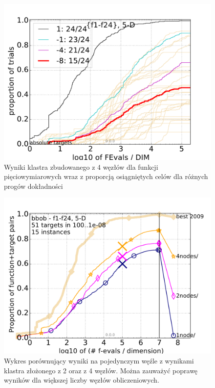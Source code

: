\documentclass[12pt, twoside, openany, abstract=on]{report}
\theoremstyle{definition}
\begin{document}
\begin{figure}[H]
    \includegraphics[scale=.75]{charts/4nodes_5D.pdf} \par
 \caption{Wyniki klastra zbudowanego z 4 węzłów dla funkcji pięciowymiarowych wraz z proporcją osiągniętych celów dla różnych progów dokładności}
\end{figure}


\begin{figure}[H]
    \includegraphics[scale=.75]{charts/124compare_5D.pdf} \par
 \caption{Wykres porównujący wyniki na pojedynczym węźle z wynikami klastra złożonego z 2 oraz z 4 węzłów. Można zauważyć poprawę wyników dla większej liczby węzłów obliczeniowych.}
\end{figure}
\end{document}
